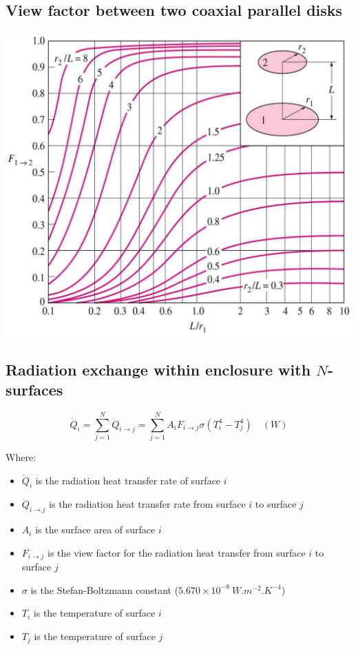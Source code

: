 \documentclass[11pt]{article}
\begin{document}
\subsection{View factor between two coaxial parallel disks}
\label{sec:org2fd81d2}
\begin{center}
\includegraphics[width=.9\linewidth]{./images/view-factors-between-two-coaxial-parallel-disks-graph.png}
\end{center}

 \newpage

\subsection{Radiation exchange within enclosure with \(N\)-surfaces}
\label{sec:org73873be}
\[\dot{Q}_i = \sum_{j=1}^N \dot{Q}_{i \rightarrow j} = \sum_{j=1}^N A_i F_{i \rightarrow j} \sigma (T_i^4 - T_j^4) \quad (\unit{W}) \]

Where:
\begin{itemize}
\item \(\dot{Q}_i\) is the radiation heat transfer rate of surface \(i\)
\item \(\dot{Q}_{i \rightarrow j}\) is the radiation heat transfer rate from surface \(i\) to surface \(j\)
\item \(A_i\) is the surface area of surface \(i\)
\item \(F_{i \rightarrow j}\) is the view factor for the radiation heat transfer from surface \(i\) to surface \(j\)
\item \(\sigma\) is the Stefan-Boltzmann constant (\(5.670 \times 10^{-8} \ \unit{W.m^{-2}.K^{-4}}\))
\item \(T_i\) is the temperature of surface \(i\)
\item \(T_j\) is the temperature of surface \(j\)
\end{itemize}
\end{document}
